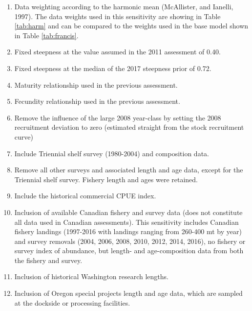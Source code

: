 \documentclass[12pt,]{article}
\begin{document}
\begin{enumerate}

  \item Data weighting according to the harmonic mean (McAllister, and Ianelli, 1997).  The data weights used in this sensitivity are showing in Table \ref{tab:harm} and can be compared to the weights used in the base model shown in Table \ref{tab:francis}.
  
  \item Fixed steepness at the value assumed in the 2011 assessment of 0.40.
  
  \item Fixed steepness at the median of the 2017 steepness prior of 0.72.
  
  \item Maturity relationship used in the previous assessment.
  
  \item Fecundity relationship used in the previous assessment.
  
  \item Remove the influence of the large 2008 year-class by setting the 2008 recruitment deviation to zero (estimated straight from the stock recruitment curve)
  
  \item Include Triennial shelf survey (1980-2004) and composition data.
  
  \item Remove all other surveys and associated length and age data, except for the Triennial shelf survey.  Fishery length and ages were retained.  
  
  \item Include the historical commercial CPUE index.
  
  \item Inclusion of available Canadian fishery and survey data (does not constitute all data used in Canadian assessments).  This sensitivity includes Canadian fishery landings (1997-2016 with landings ranging from 260-400 mt by year) and survey removals (2004, 2006, 2008, 2010, 2012, 2014, 2016), no fishery or survey index of abundance, but length- and age-composition data from both the fishery and survey.  
  
  \item Inclusion of historical Washington research lengths.  
  
  \item Inclusion of Oregon special projects length and age data, which are sampled at the dockside or processing facilities.  
  
\end{enumerate}
\end{document}
